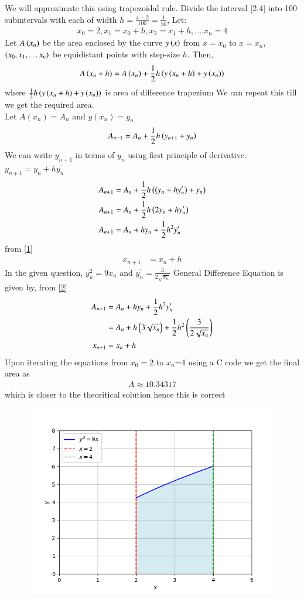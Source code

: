 \documentclass[journal]{IEEEtran}
\numberwithin{equation}{enumi}
\numberwithin{figure}{enumi}
\begin{document}
We will approximate this using trapezoidal rule. Divide the interval [2,4] into 100 subintervals with each of width $h=\frac{4-2}{100}=\frac{1}{50}$, Let:
\begin{align}
x_0=2,x_1=x_0+h,x_2=x_1+h,....x_n=4\label{1}
\end{align}
Let $A\left(x_n\right)$ be the area enclosed by the curve $y\left(x\right)$ from $x=x_0$ to $x=x_n$, $\left(x_0, x_1, \dots x_n\right)$ be equidistant points with step-size $h$. Then,
\begin{align}
  A\left(x_n+h\right)=A\left(x_n\right)+\frac{1}{2}h\left(y\left(x_n+h\right)+y\left(x_n\right)\right)
\end{align}
where $\frac{1}{2}h\left(y\left(x_n+h\right)+y\left(x_n\right)\right)$ is area of difference trapezium
We can repeat this till we get the required area.\\
Let $A(x_n)=A_n$ and $y(x_n)=y_n$
\begin{align}
        A_{n+1}=A_n+\frac{1}{2}h\left(y_{n+1}+y_n\right)
\end{align}
We can write $y_{n+1}$ in terms of $y_n$ using first principle of derivative. $y_{n+1}=y_n+hy^{\prime}_n$
\begin{align}
  A_{n+1}&=A_n+\frac{1}{2}h\left(\left(y_{n}+hy^{\prime}_n\right)+y_n\right)\\
  A_{n+1}&=A_n+\frac{1}{2}h\left(2y_n+hy^{\prime}_n\right)\\
  A_{n+1}&=A_n+hy_n+\frac{1}{2}h^2y^{\prime}_n\label{2}\\
\end{align}
from \ref{1} 
\begin{align}
    x_{n+1}&=x_n+h
\end{align}
In the given question, $y_n^2=9x_n$ and $y^{\prime}_n=\frac{3}{2\sqrt{x_n}}$\newline
General Difference Equation is given by, from \ref{2}
\begin{align}
  A_{n+1}&=A_n+hy_n+\frac{1}{2}h^2y^{\prime}_n\\
  &=A_n+h\left(3\sqrt{x_n}\right)+\frac{1}{2}h^2\left(\frac{3}{2\sqrt{x_n}}\right)\\
  x_{n+1}&=x_n+h
\end{align}
Upon iterating the equations from $x_0=2$ to $x_n$=4 using a C code we get the final area as
\begin{align}
    A\approx10.34317
\end{align}
which is closer to the theoritical solution hence this is correct
\begin{figure}[!ht]
    \centering
    \includegraphics[width=\columnwidth]{figs/Figure_1.png}
    \caption{}
\end{figure}
\end{document}
